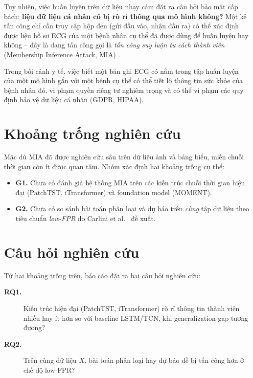 \documentclass[12pt,a4paper]{report}
\begin{document}
Tuy nhiên, việc huấn luyện trên dữ liệu nhạy cảm đặt ra câu hỏi bảo mật cấp bách: \textbf{liệu dữ liệu cá nhân có bị rò rỉ thông qua mô hình không?} Một kẻ tấn công chỉ cần truy cập hộp đen (gửi đầu vào, nhận đầu ra) có thể xác định được liệu hồ sơ ECG của một bệnh nhân cụ thể đã được dùng để huấn luyện hay không -- đây là dạng tấn công gọi là \textit{tấn công suy luận tư cách thành viên} (Membership Inference Attack, MIA) \cite{shokri2017}.

Trong bối cảnh y tế, việc biết một bản ghi ECG có nằm trong tập huấn luyện của một mô hình gắn với một bệnh cụ thể có thể tiết lộ thông tin sức khỏe của bệnh nhân đó, vi phạm quyền riêng tư nghiêm trọng và có thể vi phạm các quy định bảo vệ dữ liệu cá nhân (GDPR, HIPAA).

\section{Khoảng trống nghiên cứu}

Mặc dù MIA đã được nghiên cứu sâu trên dữ liệu ảnh và bảng biểu, miền chuỗi thời gian còn ít được quan tâm. Nhóm xác định hai khoảng trống cụ thể:

\begin{itemize}
  \item \textbf{G1.} Chưa có đánh giá hệ thống MIA trên các kiến trúc chuỗi thời gian hiện đại (PatchTST, iTransformer) và foundation model (MOMENT).
  \item \textbf{G2.} Chưa có so sánh bài toán phân loại và dự báo trên \textit{cùng} tập dữ liệu theo tiêu chuẩn \textit{low-FPR} do Carlini et al.\ \cite{carlini2022} đề xuất.
\end{itemize}

\section{Câu hỏi nghiên cứu}

Từ hai khoảng trống trên, báo cáo đặt ra hai câu hỏi nghiên cứu:

\begin{description}
  \item[\textbf{RQ1.}] Kiến trúc hiện đại (PatchTST, iTransformer) rò rỉ thông tin thành viên nhiều hay ít hơn so với baseline LSTM/TCN, khi generalization gap tương đương?
  \item[\textbf{RQ2.}] Trên cùng dữ liệu $X$, bài toán phân loại hay dự báo dễ bị tấn công hơn ở chế độ low-FPR?
\end{description}
\end{document}
